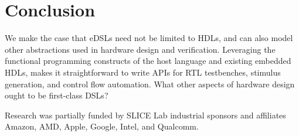 \documentclass[sigplan,review,nonacm,9pt]{acmart}
\begin{document}
\section{Conclusion}


We make the case that eDSLs need not be limited to HDLs, and can also model other abstractions used in hardware design and verification.
Leveraging the functional programming constructs of the host language and existing embedded HDLs, makes it straightforward to write APIs for RTL testbenches, stimulus generation, and control flow automation.
What other aspects of hardware design ought to be first-class DSLs?

\begin{acks}
Research was partially funded by SLICE Lab industrial sponsors and affiliates Amazon, AMD, Apple, Google, Intel, and Qualcomm.
\end{acks}




\end{document}
